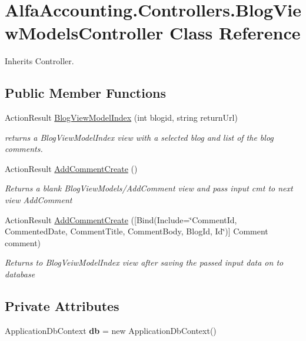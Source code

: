 \hypertarget{class_alfa_accounting_1_1_controllers_1_1_blog_view_models_controller}{}\section{Alfa\+Accounting.\+Controllers.\+Blog\+View\+Models\+Controller Class Reference}
\label{class_alfa_accounting_1_1_controllers_1_1_blog_view_models_controller}


Inherits Controller.

\subsection*{Public Member Functions}
\begin{DoxyCompactItemize}
\item 
Action\+Result \hyperlink{class_alfa_accounting_1_1_controllers_1_1_blog_view_models_controller_a1da9f6c006defe4ca559fd05e7f8accd}{Blog\+View\+Model\+Index} (int blogid, string return\+Url)
\begin{DoxyCompactList}\small\item\em returns a Blog\+View\+Model\+Index view with a selected blog and list of the blog comments. \end{DoxyCompactList}\item 
Action\+Result \hyperlink{class_alfa_accounting_1_1_controllers_1_1_blog_view_models_controller_a147f8c8c66c4416e2bfca81afc48430c}{Add\+Comment\+Create} ()
\begin{DoxyCompactList}\small\item\em Returns a blank Blog\+View\+Models/\+Add\+Comment view and pass input cmt to next view Add\+Comment \end{DoxyCompactList}\item 
Action\+Result \hyperlink{class_alfa_accounting_1_1_controllers_1_1_blog_view_models_controller_a9a48c7e353962802d1d3b1b8c8a0d315}{Add\+Comment\+Create} (\mbox{[}Bind(Include=\char`\"{}Comment\+Id, Commented\+Date, Comment\+Title, Comment\+Body, Blog\+Id, Id\char`\"{})\mbox{]} Comment comment)
\begin{DoxyCompactList}\small\item\em Returns to Blog\+Veiw\+Model\+Index view after saving the passed input data on to database \end{DoxyCompactList}\end{DoxyCompactItemize}
\subsection*{Private Attributes}
\begin{DoxyCompactItemize}
\item 
\mbox{\label{class_alfa_accounting_1_1_controllers_1_1_blog_view_models_controller_a0010220ca96c4ec2fdba3524e00bab8e}} 
Application\+Db\+Context {\bfseries db} = new Application\+Db\+Context()
\end{DoxyCompactItemize}


